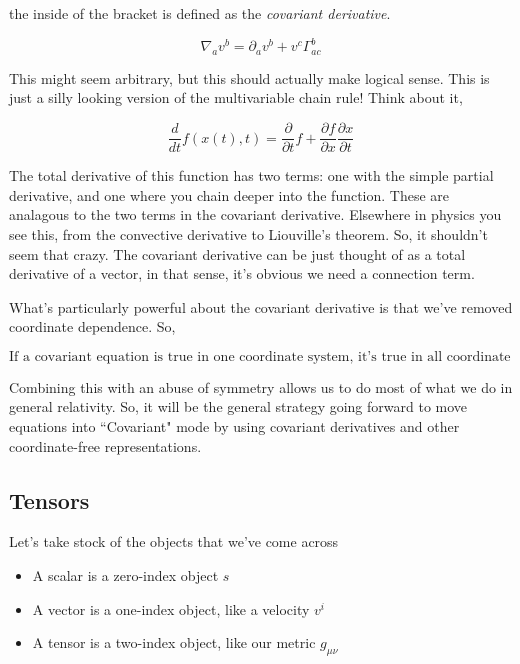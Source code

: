 \documentclass{article}
\begin{document}
the inside of the bracket is defined as the \textit{covariant derivative}.

\begin{equation}
    \nabla_a v^b = \partial_av^b + v^c \Gamma^b_{ac}
\end{equation}

This might seem arbitrary, but this should actually make logical sense. This is just a silly looking version of the multivariable chain rule! Think about it,

\begin{equation}
    \frac{d}{d t} f(x(t),t) = \frac{\partial}{\partial t}f + \frac{\partial f}{\partial x} \frac{\partial x}{\partial t}
\end{equation}

The total derivative of this function has two terms: one with the simple partial derivative, and one where you chain deeper into the function. These are analagous to the two terms in the covariant derivative. Elsewhere in physics you see this, from the convective derivative to Liouville's theorem. So, it shouldn't seem that crazy. The covariant derivative can be just thought of as a total derivative of a vector, in that sense, it's obvious we need a connection term.

What's particularly powerful about the covariant derivative is that we've removed coordinate dependence. So, 

\begin{equation}
    \boxed{\text{If a covariant equation is true in one coordinate system, it's true in all coordinate systems}}
\end{equation}

Combining this with an abuse of symmetry allows us to do most of what we do in general relativity. So, it will be the general strategy going forward to move equations into ``Covariant" mode by using covariant derivatives and other coordinate-free representations.

\subsection{Tensors}
Let's take stock of the objects that we've come across
\begin{itemize}
    \item A scalar is a zero-index object $s$
    \item A vector is a one-index object, like a velocity $v^i$
    \item A tensor is a two-index object, like our metric $g_{\mu\nu}$
\end{itemize}
\end{document}
